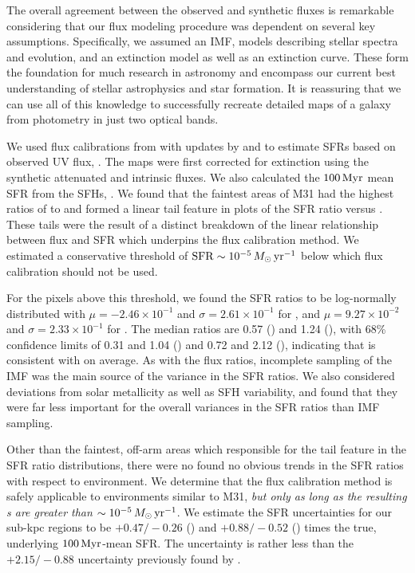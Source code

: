 \documentclass[iop, tighten]{emulateapj}
\begin{document}
The overall agreement between the observed and synthetic fluxes is remarkable
considering that our flux modeling procedure was dependent on several key
assumptions. Specifically, we assumed an IMF, models describing stellar spectra
and evolution, and an extinction model as well as an extinction curve. These
form the foundation for much research in astronomy and encompass our current
best understanding of stellar astrophysics and star formation. It is reassuring
that we can use all of this knowledge to successfully recreate detailed maps of
a galaxy from photometry in just two optical bands.

We used flux calibrations from \citet{Kennicutt:1998} with updates by
\citet{Hao:2011} and \citet{Murphy:2011} to estimate SFRs based on observed UV
flux, \sfrx{}. The \fxobs{} maps were first corrected for extinction using the
synthetic attenuated and intrinsic fluxes. We also calculated the $100\,\mathrm{Myr}$
mean SFR from the SFHs, \sfroneh{}. We found that the faintest areas of M31 had
the highest ratios of \sfrx{} to \sfroneh{} and formed a linear tail feature in
plots of the SFR ratio versus \sfroneh{}. These tails were the result of a
distinct breakdown of the linear relationship between flux and SFR which
underpins the flux calibration method. We estimated a conservative threshold of
$\mathrm{SFR} \sim 10^{-5}\,M_\odot\,\mathrm{yr}^{-1}$ below which flux calibration should not be
used.

For the pixels above this threshold, we found the SFR ratios to be log-normally
distributed with $\mu = -2.46\times 10^{-1}$ and $\sigma = 2.61\times 10^{-1}$
for \fuv{}, and $\mu = 9.27\times 10^{-2}$ and $\sigma = 2.33\times 10^{-1}$
for \nuv{}. The median ratios are 0.57 (\fuv{}) and 1.24 (\nuv{}), with 68\%
confidence limits of 0.31 and 1.04 (\fuv{}) and 0.72 and 2.12 (\nuv{}),
indicating that \sfrx{} is consistent with \sfroneh{} on average. As with the
flux ratios, incomplete sampling of the IMF was the main source of the variance
in the SFR ratios. We also considered deviations from solar metallicity as well
as SFH variability, and found that they were far less important for the overall
variances in the SFR ratios than IMF sampling.

Other than the faintest, off-arm areas which responsible for the tail feature
in the SFR ratio distributions, there were no found no obvious trends in the
SFR ratios with respect to environment. We determine that the flux calibration
method is safely applicable to environments similar to M31, \emph{but only as
long as the resulting \sfr{}s are greater than $\sim 10^{-5}\,M_\odot\,\mathrm{yr}^{-1}$}. We
estimate the SFR uncertainties for our sub-kpc regions to be
$+\!0.47/\!-\!0.26$ (\fuv{}) and $+\!0.88/\!-\!0.52$ (\nuv{}) times the true,
underlying $100\,\mathrm{Myr}$-mean SFR. The \sfrfuv{} uncertainty is rather less than
the $+\!2.15/\!-\!0.88$ uncertainty previously found by \citet{Simones:2014}.
\end{document}
